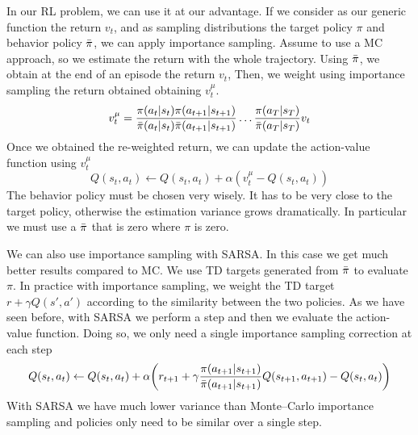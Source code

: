 \documentclass[../main.tex]{subfiles}
\begin{document}
In our RL problem, we can use it at our advantage. If we consider as our generic function the return $v_t$, and as sampling distributions the target policy $\pi$ and behavior policy $\Bar{\pi}$, we can apply importance sampling\footnotemark. Assume to use a MC approach, so we estimate the return with the whole trajectory. Using $\Bar{\pi}$, we obtain at the end of an episode the return $v_t$, Then, we weight using importance sampling the return obtained obtaining $v_t^{\mu}$.
\begin{equation}
    v_t^{\mu} = \frac{\pi(a_t|s_t) \pi(a_{t+1}|s_{t+1})}{\Bar{\pi}(a_t|s_t) \Bar{\pi}(a_{t+1}|s_{t+1})} \dots \frac{\pi(a_T|s_T)}{\Bar{\pi}(a_T|s_T)} v_t
\end{equation}
Once we obtained the re-weighted return, we can update the action-value function using $v_t^{\mu}$
\begin{equation}
    Q(s_t,a_t) \leftarrow Q(s_t,a_t) + \alpha(v_t^{\mu} - Q(s_t,a_t))
\end{equation}
The behavior policy must be chosen very wisely. It has to be very close to the target policy, otherwise the estimation variance grows dramatically. In particular we must use a $\Bar{\pi}$ that is zero where $\pi$ is zero.

We can also use importance sampling with SARSA. In this case we get much better results compared to MC.
We use TD targets generated from $\Bar{\pi}$ to evaluate $\pi$. In practice with importance sampling, we weight the TD target $r+ \gamma Q(s',a')$ according to the similarity between the two policies. As we have seen before, with SARSA we perform a step and then we evaluate the action-value function. Doing so, we only need a single importance sampling correction at each step
\begin{equation}
    Q(s_t,a_t) \leftarrow Q(s_t,a_t) + \alpha \bigg( r_{t+1}+ \gamma \frac{\pi(a_{t+1}|s_{t+1})}{\Bar{\pi}(a_{t+1}|s_{t+1})} Q(s_{t+1},a_{t+1}) - Q(s_t,a_t) \bigg)
\end{equation}
With SARSA we have much lower variance than Monte–Carlo importance sampling and policies only need to be similar over a single step.
\newpage
\end{document}
